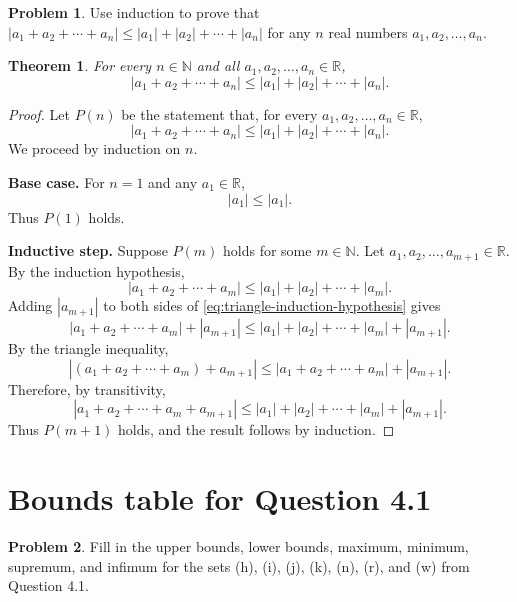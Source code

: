 \documentclass{article}
\newtheorem{theorem}{Theorem}
\theoremstyle{definition}
\newtheorem*{problem}{Problem}
\begin{document}
\begin{problem}
Use induction to prove that $|a_1+a_2+\cdots+a_n|\leq|a_1|+|a_2|+\cdots+|a_n|$ for any $n$ real numbers $a_1,a_2,\ldots,a_n$.
\end{problem}

\begin{theorem}
For every \(n\in\mathbb{N}\) and all \(a_1,a_2,\ldots,a_n\in\mathbb{R}\),
\[
\left|a_1+a_2+\cdots+a_n\right|
\leq |a_1|+|a_2|+\cdots+|a_n|.
\]
\end{theorem}

\begin{proof}
Let \(P(n)\) be the statement that, for every \(a_1,a_2,\ldots,a_n\in\mathbb{R}\),
\[
\left|a_1+a_2+\cdots+a_n\right|
\leq |a_1|+|a_2|+\cdots+|a_n|.
\]
We proceed by induction on \(n\).

\textbf{Base case.} For \(n=1\) and any \(a_1\in\mathbb{R}\),
\[
|a_1|\leq |a_1|.
\]
Thus \(P(1)\) holds.

\textbf{Inductive step.} Suppose \(P(m)\) holds for some \(m\in\mathbb{N}\).
Let \(a_1,a_2,\ldots,a_{m+1}\in\mathbb{R}\).
By the induction hypothesis,
\begin{equation}\label{eq:triangle-induction-hypothesis}
\left|a_1+a_2+\cdots+a_m\right|
\leq |a_1|+|a_2|+\cdots+|a_m|.
\end{equation}
Adding \(|a_{m+1}|\) to both sides of \eqref{eq:triangle-induction-hypothesis} gives
\[
\left|a_1+a_2+\cdots+a_m\right|+|a_{m+1}|
\leq |a_1|+|a_2|+\cdots+|a_m|+|a_{m+1}|.
\]
By the triangle inequality,
\[
\left|(a_1+a_2+\cdots+a_m)+a_{m+1}\right|
\leq \left|a_1+a_2+\cdots+a_m\right|+|a_{m+1}|.
\]
Therefore, by transitivity,
\[
\left|a_1+a_2+\cdots+a_m+a_{m+1}\right|
\leq |a_1|+|a_2|+\cdots+|a_m|+|a_{m+1}|.
\]
Thus \(P(m+1)\) holds, and the result follows by induction.
\end{proof}

\clearpage
\section{Bounds table for Question 4.1}

\begin{problem}
Fill in the upper bounds, lower bounds, maximum, minimum, supremum, and infimum for the sets (h), (i), (j), (k), (n), (r), and (w) from Question 4.1.
\end{problem}
\end{document}

